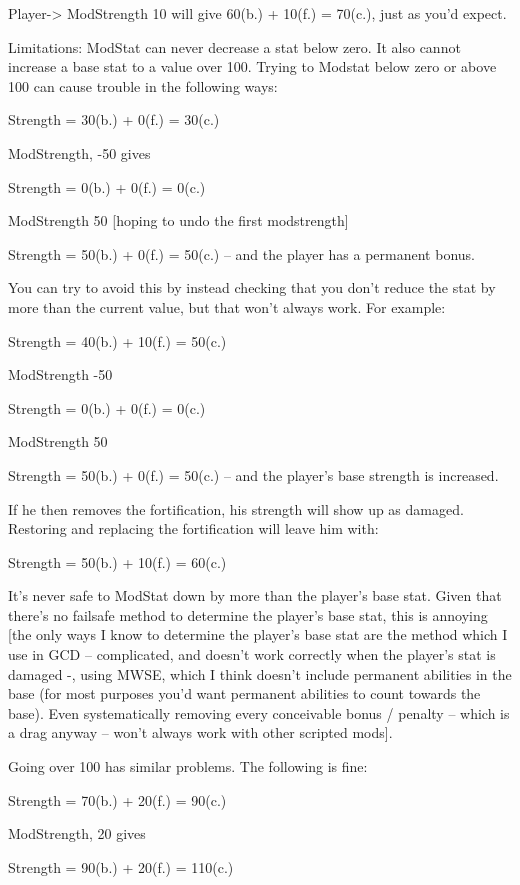 Player-> ModStrength 10 will give 60(b.) + 10(f.) = 70(c.),
just as you'd expect.

Limitations: ModStat can never decrease a stat below zero. It also
cannot increase a base stat to a value over 100. Trying to Modstat below
zero or above 100 can cause trouble in the following ways:

Strength = 30(b.) + 0(f.) = 30(c.)

ModStrength, -50 gives

Strength = 0(b.) + 0(f.) = 0(c.)

ModStrength 50 {[}hoping to undo the first modstrength{]}

Strength = 50(b.) + 0(f.) = 50(c.) -- and the player has a permanent
bonus.

You can try to avoid this by instead checking that you don't reduce the
stat by more than the current value, but that won't always work. For
example:

Strength = 40(b.) + 10(f.) = 50(c.)

ModStrength -50

Strength = 0(b.) + 0(f.) = 0(c.)

ModStrength 50

Strength = 50(b.) + 0(f.) = 50(c.) -- and the player's base strength is
increased.

If he then removes the fortification, his strength will show up as
damaged. Restoring and replacing the fortification will leave him with:

Strength = 50(b.) + 10(f.) = 60(c.)

It's never safe to ModStat down by more than the player's base stat.
Given that there's no failsafe method to determine the player's base
stat, this is annoying {[}the only ways I know to determine the player's
base stat are the method which I use in GCD -- complicated, and doesn't
work correctly when the player's stat is damaged -, using MWSE, which I
think doesn't include permanent abilities in the base (for most purposes
you'd want permanent abilities to count towards the base). Even
systematically removing every conceivable bonus / penalty -- which is a
drag anyway -- won't always work with other scripted mods{]}.

Going over 100 has similar problems. The following is fine:

Strength = 70(b.) + 20(f.) = 90(c.)

ModStrength, 20 gives

Strength = 90(b.) + 20(f.) = 110(c.)

